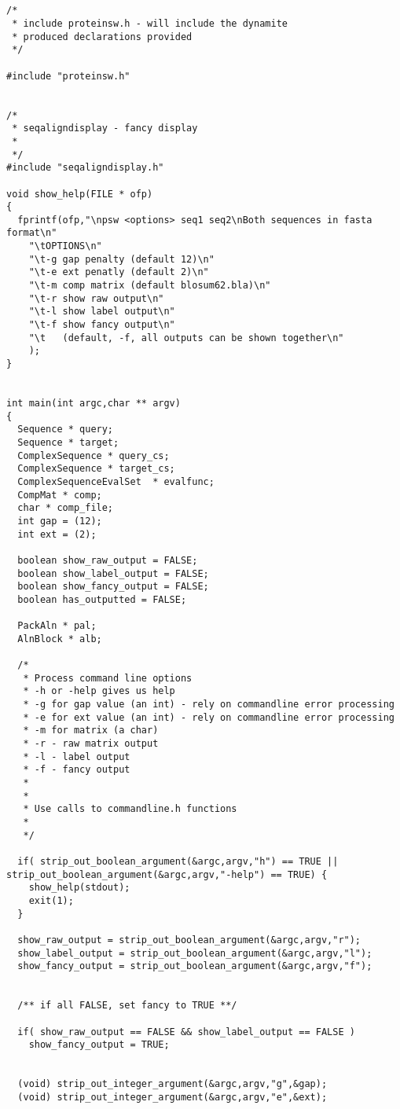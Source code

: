 \begin{verbatim}


/*
 * include proteinsw.h - will include the dynamite
 * produced declarations provided
 */

#include "proteinsw.h" 


/*
 * seqaligndisplay - fancy display 
 *
 */
#include "seqaligndisplay.h"

void show_help(FILE * ofp)
{
  fprintf(ofp,"\npsw <options> seq1 seq2\nBoth sequences in fasta format\n"
    "\tOPTIONS\n"
    "\t-g gap penalty (default 12)\n"
    "\t-e ext penatly (default 2)\n"
    "\t-m comp matrix (default blosum62.bla)\n"
    "\t-r show raw output\n"
    "\t-l show label output\n"
    "\t-f show fancy output\n"
    "\t   (default, -f, all outputs can be shown together\n"
    );
}


int main(int argc,char ** argv)
{
  Sequence * query;
  Sequence * target;
  ComplexSequence * query_cs;
  ComplexSequence * target_cs;
  ComplexSequenceEvalSet  * evalfunc;
  CompMat * comp;
  char * comp_file;
  int gap = (12);
  int ext = (2);

  boolean show_raw_output = FALSE;
  boolean show_label_output = FALSE;
  boolean show_fancy_output = FALSE;
  boolean has_outputted = FALSE;

  PackAln * pal;
  AlnBlock * alb;
  
  /*
   * Process command line options
   * -h or -help gives us help
   * -g for gap value (an int) - rely on commandline error processing
   * -e for ext value (an int) - rely on commandline error processing
   * -m for matrix (a char)
   * -r - raw matrix output
   * -l - label output
   * -f - fancy output
   *
   *
   * Use calls to commandline.h functions
   *
   */
  
  if( strip_out_boolean_argument(&argc,argv,"h") == TRUE || strip_out_boolean_argument(&argc,argv,"-help") == TRUE) {
    show_help(stdout);
    exit(1);
  }

  show_raw_output = strip_out_boolean_argument(&argc,argv,"r");
  show_label_output = strip_out_boolean_argument(&argc,argv,"l");
  show_fancy_output = strip_out_boolean_argument(&argc,argv,"f");


  /** if all FALSE, set fancy to TRUE **/

  if( show_raw_output == FALSE && show_label_output == FALSE ) 
    show_fancy_output = TRUE;


  (void) strip_out_integer_argument(&argc,argv,"g",&gap);
  (void) strip_out_integer_argument(&argc,argv,"e",&ext);


\end{verbatim}
